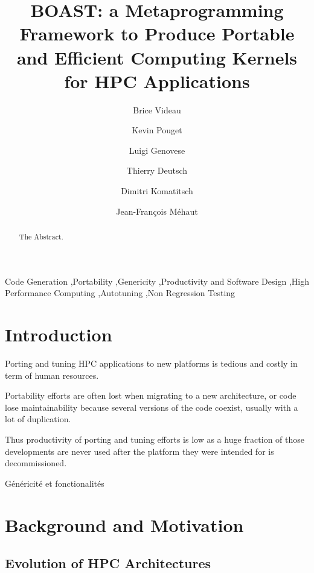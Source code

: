 \documentclass[review]{elsarticle}
\begin{document}
\begin{frontmatter}

\title{BOAST: a Metaprogramming Framework to Produce Portable and Efficient Computing Kernels for HPC Applications}

\author[mymainaddress]{Brice Videau}
\author{Kevin Pouget}
\author{Luigi Genovese}
\author{Thierry Deutsch}
\author{Dimitri Komatitsch}
\author{Jean-François Méhaut}

\address[mymainaddress]{LIG/CNRS}

\begin{abstract}
The Abstract.
\end{abstract}

\begin{keyword}
Code Generation \sep Portability \sep Genericity \sep Productivity and Software
Design \sep High Performance Computing \sep Autotuning \sep Non Regression
Testing
\end{keyword}

\end{frontmatter}

\linenumbers

\section{Introduction}

Porting and tuning HPC applications to new platforms is tedious and costly
in term of human resources.

Portability efforts are often lost when
migrating to a new architecture, or code lose maintainability because
several versions of the code coexist, usually with a lot of duplication.

Thus productivity of porting and tuning efforts is low as a huge fraction
of those developments are never used after the platform they were intended
for is decommissioned.

Généricité
 et
fonctionalités

\section{Background and Motivation}



  \subsection{Evolution of HPC Architectures}
\end{document}
